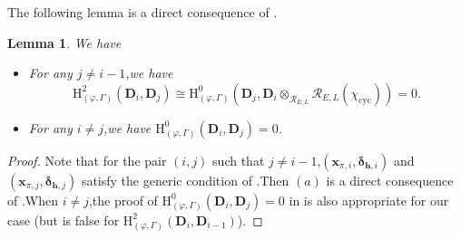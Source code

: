 \documentclass[SecEq,CM,GP]{degruyter-crelle} %
\theoremstyle{plain}
\newtheorem{lem}[thm]{Lemma}
\newcommand{\ccyc}{{\chi_{\mathrm{cyc}}}}
\newcommand{\Dpik}{{\mathbf{D}}}
\newcommand{\hH}{{\mathrm{H}}}
\newcommand{\tee}{{{\otimes}_{\cR_{E,L}}}}
\newcommand{\bx}{{\mathbf{x}}}
\newcommand{\bh}{{\mathbf{h}}}
\newcommand{\cR}{\mathcal R}
\begin{document}
The following lemma is a direct consequence of \cite[Lemma 4.1.12]{Ding2021}.\;
\begin{lem}\label{phigammacohononcrtialspecial}We have
\begin{itemize}
	\item[(a)] For any $j\neq i-1$,\;we have $$\hH^2_{(\varphi,\Gamma)}(\Dpik_{i},\Dpik_{j})\cong \hH^0_{(\varphi,\Gamma)}(\Dpik_{j},\Dpik_{i}\tee\cR_{E,L}(\ccyc))=0.$$
	\item[(b)] For any $i\neq j$,\;we have $\hH^0_{(\varphi,\Gamma)}(\Dpik_{i},\Dpik_{j})=0$.
\end{itemize}
\end{lem}
\begin{proof}Note that for the pair $(i,j)$ such that $j\neq i-1$,\;$(\bx_{\pi,i},\bm{\delta}_{\bh,i})$ and $(\bx_{\pi,j},\bm{\delta}_{\bh,j})$ satisfy the generic condition of \cite[(4.13)]{Ding2021}.\;Then $(a)$ is a direct consequence of \cite[Lemma 4.1.12]{Ding2021}.\;When $i\neq j$,\;the proof of	 $\hH^0_{(\varphi,\Gamma)}(\Dpik_{i},\Dpik_{j})=0$ in \cite[Lemma 4.1.12]{Ding2021} is also appropriate for our case (but is false for $\hH^2_{(\varphi,\Gamma)}(\Dpik_{i},\Dpik_{i-1})$).\;
\end{proof}
\end{document}
